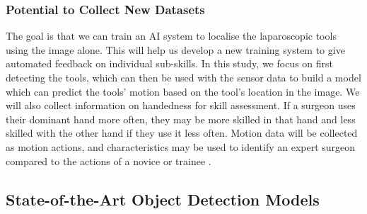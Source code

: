 \subsubsection{Potential to Collect New Datasets}

The goal is that we can train an AI system to localise the laparoscopic tools using the image alone. This will help us develop a new training system to give automated feedback on individual sub-skills. In this study, we focus on first detecting the tools, which can then be used with the sensor data to build a model which can predict the tools' motion based on the tool's location in the image. We will also collect information on handedness for skill assessment. If a surgeon uses their dominant hand more often, they may be more skilled in that hand and less skilled with the other hand if they use it less often. Motion data will be collected as motion actions, and characteristics may be used to identify an expert surgeon compared to the actions of a novice or trainee \cite{jones_analysis_2018}.




\subsection{State-of-the-Art Object Detection Models}

